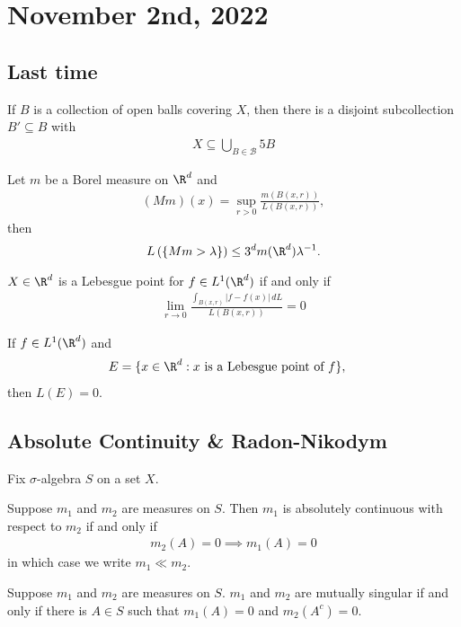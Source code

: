 \section{November 2nd, 2022}

\subsection*{Last time}

\begin{theorem}[Vitali]
	If $B$ is a collection of open balls covering $X$, then there is a disjoint subcollection $B' \subseteq B$ with
	\begin{align*}
		X \subseteq \bigcup_{B \in \mathcal{B}} 5 B
	\end{align*}
\end{theorem}

\begin{theorem}
	Let $m$ be a Borel measure on $\R^{d}$ and
	\begin{align*}
		(M m )(x) = \sup_{r > 0} \frac{m (B(x, r))}{L (B(x,r))},
	\end{align*}
  then
  \[
		L\left( \{ M m > \lambda \} \right) \leq 3^{d} m (\R^d) \lambda^{-1}.
  \]
\end{theorem}

\begin{definition}
	$X \in \R^{d}$ is a Lebesgue point for $f \in L^{1} ( \R^{d} )$ if and only if
	\begin{align*}
		\lim_{r \to 0} \frac{\int_{B(x, r)} | f - f(x) | \, dL}{L (B(x, r))} = 0
	\end{align*}
\end{definition}

\begin{definition}
	If $f \in L^{1}( \R^{d})$ and
	\begin{align*}
		&E = \{ x \in \R^{d} : x \text{ is a Lebesgue point of } f \},
	\end{align*}
	then $L(E) = 0$.
\end{definition}


\subsection{Absolute Continuity \& Radon-Nikodym}

Fix $\sigma$-algebra $S$ on a set $X$.

\begin{definition}
	Suppose $m_1$ and $m_{2}$ are measures on $S$. Then $m_1$ is absolutely continuous with respect to $m_{2}$ if and only if
	\begin{align*}
		m_{2} (A) = 0 \implies m_1 (A) = 0
	\end{align*} in which case we write $m_1 \ll m_2$.
\end{definition}
\begin{definition}
	Suppose $m_1$ and $m_2$ are measures on $S$. $m_1$ and $m_2$ are mutually singular if and only if there is $A \in S$ such that $m_1(A) = 0$ and $m_2(A^c) = 0$.
\end{definition}

